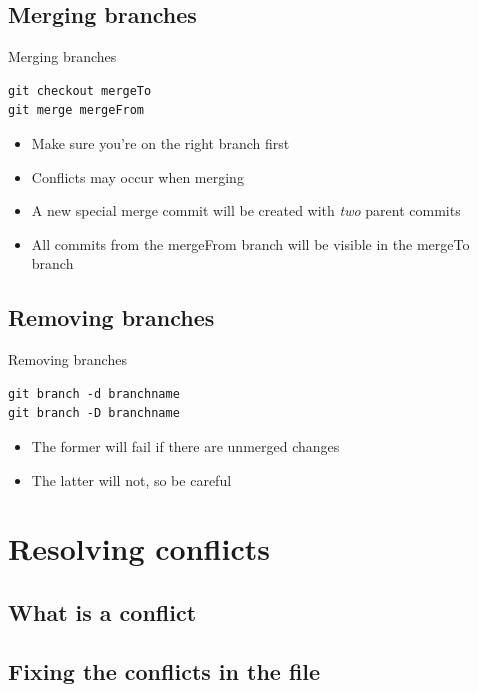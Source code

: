 \documentclass[10pt,a4paper]{beamer}
\begin{document}
\subsection{Merging branches}
\begin{frame}[fragile]{Merging branches}
\begin{verbatim}
git checkout mergeTo
git merge mergeFrom
\end{verbatim}
\begin{itemize}
\item Make sure you're on the right branch first
\item Conflicts may occur when merging
\item A new special merge commit will be created with \textit{two} parent commits
\item All commits from the mergeFrom branch will be visible in the mergeTo branch
\end{itemize}
\end{frame}

\subsection{Removing branches}
\begin{frame}[fragile]{Removing branches}
\begin{verbatim}
git branch -d branchname
git branch -D branchname
\end{verbatim}
\begin{itemize}
\item The former will fail if there are unmerged changes
\item The latter will not, so be careful
\end{itemize}
\end{frame}


\section{Resolving conflicts}

\subsection{What is a conflict}
\begin{frame}

\end{frame}

\subsection{Fixing the conflicts in the file}
\begin{frame}

\end{frame}
\end{document}
